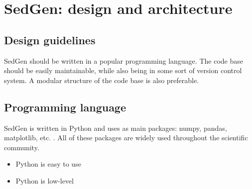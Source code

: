 \chapter{SedGen: design and architecture}\label{ch:sedgen_architecture}

%
%

\section{Design guidelines}
SedGen should be written in a popular programming language. %
The code base should be easily maintainable, while also being in some sort of version control system. %
A modular structure of the code base is also preferable. %


\section{Programming language}
SedGen is written in Python and uses as main packages: numpy, pandas, matplotlib, etc. . %
All of these packages are widely used throughout the scientific community. %
\begin{itemize}
    \item Python is easy to use
    \item Python is low-level
\end{itemize}



\cleardoublepage

